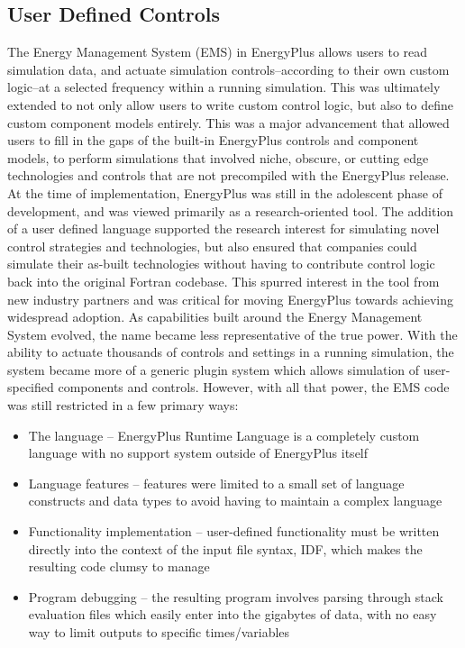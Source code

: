 \documentclass[5p]{elsarticle}
\begin{document}
  \subsection{User Defined Controls}
The Energy Management System (EMS) in EnergyPlus allows users to read simulation data, and actuate simulation controls--according to their own custom logic--at a selected frequency within a running simulation.  This was ultimately extended to not only allow users to write custom control logic, but also to define custom component models entirely.  This was a major advancement that allowed users to fill in the gaps of the built-in EnergyPlus controls and component models, to perform simulations that involved niche, obscure, or cutting edge technologies and controls that are not precompiled with the EnergyPlus release.  At the time of implementation, EnergyPlus was still in the adolescent phase of development, and was viewed primarily as a research-oriented tool.  The addition of a user defined language supported the research interest for simulating novel control strategies and technologies, but also ensured that companies could simulate their as-built technologies without having to contribute control logic back into the original Fortran codebase.  This spurred interest in the tool from new industry partners and was critical for moving EnergyPlus towards achieving widespread adoption.  As capabilities built around the Energy Management System evolved, the name became less representative of the true power.  With the ability to actuate thousands of controls and settings in a running simulation, the system became more of a generic plugin system which allows simulation of user-specified components and controls.  However, with all that power, the EMS code was still restricted in a few primary ways:
\begin{itemize}
  \item The language -- EnergyPlus Runtime Language is a completely custom language with no support system outside of EnergyPlus itself
  \item Language features -- features were limited to a small set of language constructs and data types to avoid having to maintain a complex language
  \item Functionality implementation -- user-defined functionality must be written directly into the context of the input file syntax, IDF, which makes the resulting code clumsy to manage
  \item Program debugging -- the resulting program involves parsing through stack evaluation files which easily enter into the gigabytes of data, with no easy way to limit outputs to specific times/variables
\end{itemize}
\end{document}
